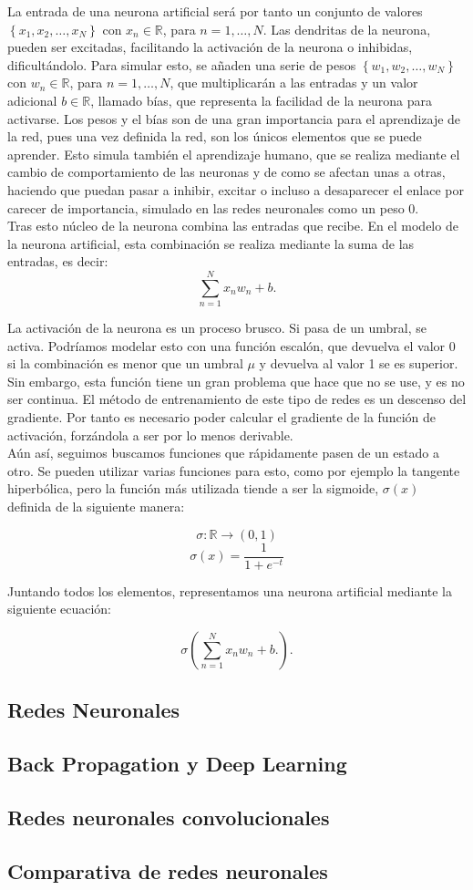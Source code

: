 La entrada de una neurona artificial será por tanto un conjunto de valores $\left\lbrace x_1,x_2,\ldots,x_N\right\rbrace$ con $x_n \in \mathbb{R}$, para $n = 1,\ldots,N$. Las dendritas de la neurona, pueden ser excitadas, facilitando la activación de la neurona o inhibidas, dificultándolo. Para simular esto, se añaden una serie de pesos $\left\lbrace w_1,w_2,\ldots,w_N\right\rbrace$ con $w_n \in \mathbb{R}$, para $n = 1,\ldots,N$, que multiplicarán a las entradas y un valor adicional $b \in \mathbb{R}$, llamado bías, que representa la facilidad de la neurona para activarse. Los pesos y el bías son de una gran importancia para el aprendizaje de la red, pues una vez definida la red, son los únicos elementos que se puede aprender. Esto simula también el aprendizaje humano, que se realiza mediante el cambio de comportamiento de las neuronas y de como se afectan unas a otras, haciendo que puedan pasar a inhibir, excitar o incluso a desaparecer el enlace por carecer de importancia, simulado en las redes neuronales como un peso 0.\\

Tras esto núcleo de la neurona combina las entradas que recibe. En el modelo de la neurona artificial, esta combinación se realiza mediante la suma de las entradas, es decir: $$\sum^N_{n=1} x_n w_n + b. $$

La activación de la neurona es un proceso brusco. Si pasa de un umbral, se activa. Podríamos modelar esto con una función escalón, que devuelva el valor 0 si la combinación es menor que un umbral $\mu$ y devuelva al valor 1 se es superior. Sin embargo, esta función tiene un gran problema que hace que no se use, y es no ser continua. El método de entrenamiento de este tipo de redes es un descenso del gradiente. Por tanto es necesario poder calcular el gradiente de la función de activación, forzándola a ser por lo menos derivable.\\

Aún así, seguimos buscamos funciones que rápidamente pasen de un estado a otro. Se pueden utilizar varias funciones para esto, como por ejemplo la tangente hiperbólica, pero la función más utilizada tiende a ser la sigmoide, $\sigma(x)$ definida de la siguiente manera:

$$\sigma: \mathbb{R}\longrightarrow (0,1)$$
$$\sigma(x)= \frac{1}{1+e^{-t}}$$

Juntando todos los elementos, representamos una neurona artificial mediante la siguiente ecuación:

$$\sigma \left( \sum^N_{n=1} x_n w_n + b. \right).$$

\subsection{Redes Neuronales}
\subsection{Back Propagation y Deep Learning}
\subsection{Redes neuronales convolucionales}
\subsection{Comparativa de redes neuronales}

